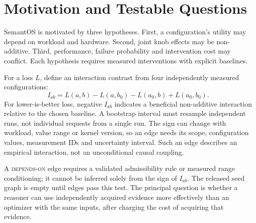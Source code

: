 \section{Motivation and Testable Questions}
\label{sec:motivation}
SemantOS is motivated by three hypotheses. First, a configuration's utility may depend on workload and hardware. Second, joint knob effects may be non-additive. Third, performance, failure probability and intervention cost may conflict. Each hypothesis requires measured interventions with explicit baselines.

For a loss $L$, define an interaction contrast from four independently measured configurations:
\[
 I_{ab}=L(a,b)-L(a,b_0)-L(a_0,b)+L(a_0,b_0).
\]
For lower-is-better loss, negative $I_{ab}$ indicates a beneficial non-additive interaction relative to the chosen baseline. A bootstrap interval must resample independent runs, not individual requests from a single run. The sign can change with workload, value range or kernel version, so an edge needs its scope, configuration values, measurement IDs and uncertainty interval. Such an edge describes an empirical interaction, not an unconditional causal coupling.

A \textsc{depends-on} edge requires a validated admissibility rule or measured range conditioning; it cannot be inferred solely from the sign of $I_{ab}$. The released seed graph is empty until edges pass this test. The principal question is whether a reasoner can use independently acquired evidence more effectively than an optimizer with the same inputs, after charging the cost of acquiring that evidence.
